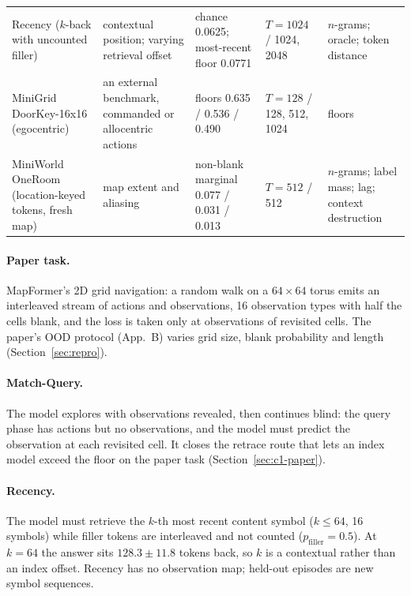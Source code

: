\documentclass[10pt]{article}
\begin{document}
\begin{table}[t]
\begin{tabular}{@{}>{\raggedright\arraybackslash}p{2.7cm}>{\raggedright\arraybackslash}p{3.7cm}>{\raggedright\arraybackslash}p{2.9cm}>{\raggedright\arraybackslash}p{2.1cm}>{\raggedright\arraybackslash}p{2.6cm}@{}}
Recency ($k$-back with uncounted filler) & contextual position; varying retrieval offset & chance 0.0625; most-recent floor 0.0771 & $T=1024$ / 1024, 2048 & $n$-grams; oracle; token distance \\
MiniGrid DoorKey-16x16 (egocentric) & an external benchmark, commanded or allocentric actions & floors 0.635 / 0.536 / 0.490 & $T=128$ / 128, 512, 1024 & floors \\
MiniWorld OneRoom (location-keyed tokens, fresh map) & map extent and aliasing & non-blank marginal 0.077 / 0.031 / 0.013 & $T=512$ / 512 & $n$-grams; label mass; lag; context destruction \\
\bottomrule
\end{tabular}
\end{table}

\paragraph{Paper task.} MapFormer's 2D grid navigation: a random walk on a $64\times64$ torus emits an
interleaved stream of actions and observations, 16 observation types with half the cells blank, and
the loss is taken only at observations of revisited cells. The paper's OOD protocol (App.~B)
varies grid size, blank probability and length (Section~\ref{sec:repro}).

\paragraph{Match-Query.} The model explores with observations revealed, then continues blind: the
query phase has actions but no observations, and the model must predict the observation at each
revisited cell. It closes the retrace route that lets an index model exceed the floor on the paper
task (Section~\ref{sec:c1-paper}).

\paragraph{Recency.} The model must retrieve the $k$-th most recent content symbol ($k\le64$, 16
symbols) while filler tokens are interleaved and not counted ($p_{\mathrm{filler}}=0.5$). At $k=64$
the answer sits $128.3\pm11.8$ tokens back, so $k$ is a contextual rather than an index offset.
Recency has no observation map; held-out episodes are new symbol sequences.
\end{document}
